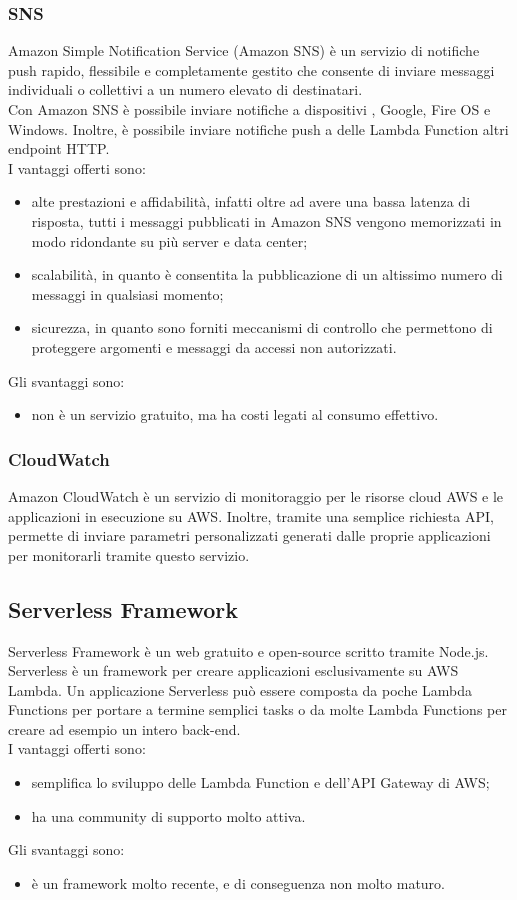 \subsubsection{SNS}
Amazon Simple Notification Service (Amazon SNS) è un servizio di notifiche push rapido, flessibile e completamente gestito che consente di inviare messaggi individuali o collettivi a un numero elevato di destinatari. \\
Con Amazon SNS è possibile inviare notifiche a dispositivi , Google, Fire OS e Windows. Inoltre, è possibile inviare notifiche push a delle Lambda Function  altri endpoint HTTP. \\
I vantaggi offerti sono:
\begin{itemize}
	\item alte prestazioni e affidabilità, infatti oltre ad avere una bassa latenza di risposta, tutti i messaggi pubblicati in Amazon SNS vengono memorizzati in modo ridondante su più server e data center;
	\item scalabilità, in quanto è consentita la pubblicazione di un altissimo numero di messaggi in qualsiasi momento;
	\item sicurezza, in quanto sono forniti meccanismi di controllo che permettono di proteggere argomenti e messaggi da accessi non autorizzati.
\end{itemize}
Gli svantaggi sono:
\begin{itemize}
	\item non è un servizio gratuito, ma ha costi legati al consumo effettivo.
\end{itemize}
\subsubsection{CloudWatch}
Amazon CloudWatch è un servizio di monitoraggio per le risorse cloud AWS e le applicazioni in esecuzione su AWS. Inoltre, tramite una semplice richiesta API, permette di inviare parametri personalizzati generati dalle proprie applicazioni per monitorarli tramite questo servizio.
\subsection{Serverless Framework}
Serverless Framework è un web  gratuito e open-source scritto tramite Node.js. Serverless è un framework per creare applicazioni esclusivamente su AWS Lambda. Un applicazione Serverless può essere composta da poche Lambda Functions per portare a termine semplici tasks o da molte Lambda Functions per creare ad esempio un intero back-end.\\
I vantaggi offerti sono:
\begin{itemize}
	\item semplifica lo sviluppo delle Lambda Function e dell'API Gateway di AWS;
  \item ha una community di supporto molto attiva.
\end{itemize}
Gli svantaggi sono:
\begin{itemize}
	\item è un framework molto recente, e di conseguenza non molto maturo.
\end{itemize}

